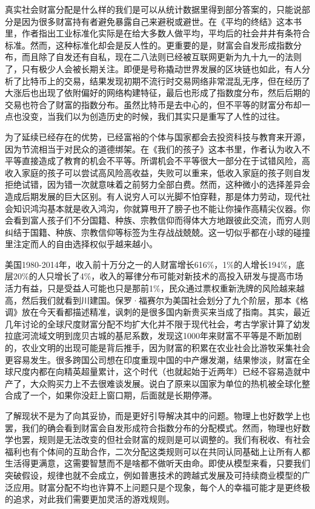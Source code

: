 \documentclass[]{book}
\begin{document}
真实社会财富分配是什么样的我们是可以从统计数据里得到部分答案的，只能说部分是因为很多财富持有者避免暴露自己来避税或避世。在《平均的终结》这本书里，作者指出工业标准化实际是在给大多数人做平均，平均后的社会井井有条符合标准。然而，这种标准化却会是反人性的。更重要的是，财富会自发形成指数分布，而且除了自发还有自私，现在二八法则已经被互联网更新为九十九一的法则了，只有极少人会被长期关注。即便是号称撬动世界发展的区块链也如此，有人分析了比特币上的交易，结果发现初期不流行时交易网络非常混乱无序，但在经历了大涨后也出现了依附偏好的网络构建特征，最后也形成了指数度分布，然后后期的交易也符合了财富的指数分布。虽然比特币是去中心的，但不平等的财富分布却一点也没变，当我们以为创造历史的时候，我们其实只是重写了人性的过往。

为了延续已经存在的优势，已经富裕的个体与国家都会去投资科技与教育来开源，因为节流相当于对民众的道德绑架。在《我们的孩子》这本书里，作者认为收入不平等直接造成了教育的机会不平等。所谓机会不平等很大一部分在于试错风险，高收入家庭的孩子可以尝试高风险高收益，失败可以重来，低收入家庭的孩子则自发拒绝试错，因为错一次就意味着之前努力全部白费。然而，这种微小的选择差异会造成后期发展的巨大区别。有人说穷人可以光脚不怕穿鞋，那是体力劳动，现代社会知识鸿沟基本就是收入鸿沟，你就算甩开了膀子也不能让你操作高精尖仪器。你会看到富人孩子们不分国籍、种族、宗教信仰而得体大方地跟彼此交流，而穷人则纠结于国籍、种族、宗教信仰等标签为生存战战兢兢。这一切似乎都在小球的碰撞里注定而人的自由选择权似乎越来越小。

美国1980-2014年，收入前十万分之一的人财富增长616\%，1\%的人增长194\%，底层20\%的人只增长了4\%，收入的幂律分布可能对新技术的高投入研发与提高市场活力有益，只是受益人可能也只是那前1\%，民众通过票权重新洗牌的风险越来越高，然后我们就看到川建国。保罗·福赛尔为美国社会划分了九个阶层，那本《格调》放在今天看都描述精准，讽刺的是很多国内新贵买来当成了指南。其实，最近几年讨论的全球尺度财富分配不均扩大化并不限于现代社会，考古学家计算了幼发拉底河流域文明到庞贝古城的基尼系数，发现这1000年来财富不平等是不断加剧的，农业文明的出现可能是背后推手，因为财富的积累在农业社会比游牧采集社会更容易发生。很多跨国公司想在印度重现中国的中产爆发潮，结果惨淡，财富在全球尺度内都在向精英超量累计，这个时代（也就起始于近两年）已经不容易造就中产了，大众购买力上不去很难谈发展。说白了原来以国家为单位的热机被全球化整合成了一个，如果你没赶上窗口期，后面就是长期停滞。

了解现状不是为了向其妥协，而是更好引导解决其中的问题。物理上也好数学上也罢，我们的确会看到财富会自发形成符合指数分布的分配模式。然而，物理也好数学也罢，规则是无法改变的但社会财富的规则是可以调整的。我们有税收、有社会福利也有个体间的互助合作，二次分配这类规则可以在共同认同基础上让所有人都生活得更满意，这需要智慧而不是啥都不做听天由命。即使从模型来看，只要我们突破假设，规律也就不会成立，例如普惠技术的跨越式发展及可持续商业模型的广泛应用。财富分配不均也许算不上问题只是个现象，每个人的幸福可能才是更终极的追求，对此我们需要更加灵活的游戏规则。
\end{document}
